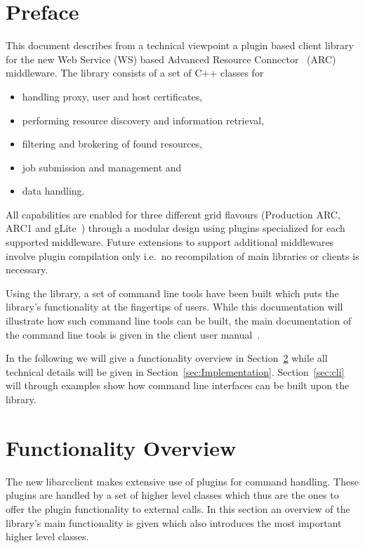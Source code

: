 \documentclass{book}
\newcommand{\libarcclient}{libarcclient}
\begin{document}
\tableofcontents                   %
\newpage
\chapter{Preface}
\label{sec:intro}

This document describes from a technical viewpoint a plugin based
client library for the new Web Service (WS) based Advanced Resource
Connector~\cite{arc} (ARC) middleware. The library consists of a set
of C++ classes for

\begin{itemize}
\item{handling proxy, user and host certificates,}
\item{performing resource discovery and information retrieval,}
\item{filtering and brokering of found resources,}
\item{job submission and management and}
\item{data handling.}
\end{itemize}

All capabilities are enabled for three different grid flavours
(Production ARC, ARC1 and gLite~\cite{glite}) through a modular design
using plugins specialized for each supported middleware. Future
extensions to support additional middlewares involve plugin
compilation only i.e.\ no recompilation of main libraries or clients
is necessary.

Using the library, a set of command line tools have been built which
puts the library's functionality at the fingertips of users. While
this documentation will illustrate how such command line tools can be
built, the main documentation of the command line tools is given in
the client user manual~\cite{ui}.

In the following we will give a functionality overview in
Section~\ref{sec:FuncOver} while all technical details will be given
in Section~\ref{sec:Implementation}. Section~\ref{sec:cli} will
through examples show how command line interfaces can be built upon
the library.

\chapter{Functionality Overview}
\label{sec:FuncOver}

The new {\libarcclient} makes extensive use of plugins for command
handling. These plugins are handled by a set of higher level classes
which thus are the ones to offer the plugin functionality to external
calls. In this section an overview of the library's main functionality
is given which also introduces the most important higher level
classes.
\end{document}
